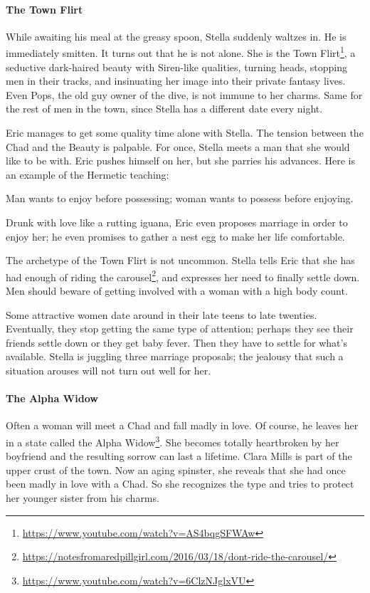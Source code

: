 \paragraph{The Town Flirt}


While awaiting his meal at the greasy spoon, Stella suddenly waltzes in. He is immediately smitten. It turns out that he is not alone. She is the Town Flirt\footnote{\url{https://www.youtube.com/watch?v=AS4bqgSFWAw}}, a seductive dark-haired beauty with Siren-like qualities, turning heads, stopping men in their tracks, and insinuating her image into their private fantasy lives. Even Pops, the old guy owner of the dive, is not immune to her charms. Same for the rest of men in the town, since Stella has a different date every night.

Eric manages to get some quality time alone with Stella. The tension between the Chad and the Beauty is palpable. For once, Stella meets a man that she would like to be with. Eric pushes himself on her, but she parries his advances. Here is an example of the Hermetic teaching:

\begin{quotex}
Man wants to enjoy before possessing; woman wants to possess before enjoying.
\end{quotex}


Drunk with love like a rutting iguana, Eric even proposes marriage in order to enjoy her; he even promises to gather a nest egg to make her life comfortable.

The archetype of the Town Flirt is not uncommon. Stella tells Eric that she has had enough of riding the carousel\footnote{\url{https://notesfromaredpillgirl.com/2016/03/18/dont-ride-the-carousel/}}, and expresses her need to finally settle down. Men should beware of getting involved with a woman with a high body count.

Some attractive women date around in their late teens to late twenties. Eventually, they stop getting the same type of attention; perhaps they see their friends settle down or they get baby fever. Then they have to settle for what's available. Stella is juggling three marriage proposals; the jealousy that such a situation arouses will not turn out well for her.

\paragraph{The Alpha Widow}


Often a woman will meet a Chad and fall madly in love. Of course, he leaves her in a state called the Alpha Widow\footnote{\url{https://www.youtube.com/watch?v=6ClzNJglxVU}}. She becomes totally heartbroken by her boyfriend and the resulting sorrow can last a lifetime. Clara Mills is part of the upper crust of the town. Now an aging spinster, she reveals that she had once been madly in love with a Chad. So she recognizes the type and tries to protect her younger sister from his charms.

